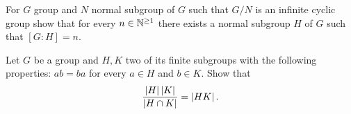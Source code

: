 \begin{exercise}
For \(G\) group and \(N\) normal subgroup of \(G\) such that \(G/N\) is an infinite cyclic group show that for every \(n \in \mathbb N^{\ge 1}\) there exists a normal subgroup \(H\) of \(G\) such that \([G:H] = n\).
\end{exercise}

\begin{exercise}
Let \(G\) be a group and \(H, K\) two of its finite subgroups with the following properties: \(ab = ba\) for every \(a \in H\) and \(b \in K\).
Show that
\[\frac{\left\lvert H\right\rvert \left\lvert K\right\rvert}{\left\lvert H \cap K\right\rvert} = \left\lvert HK\right\rvert .\]
\end{exercise}

